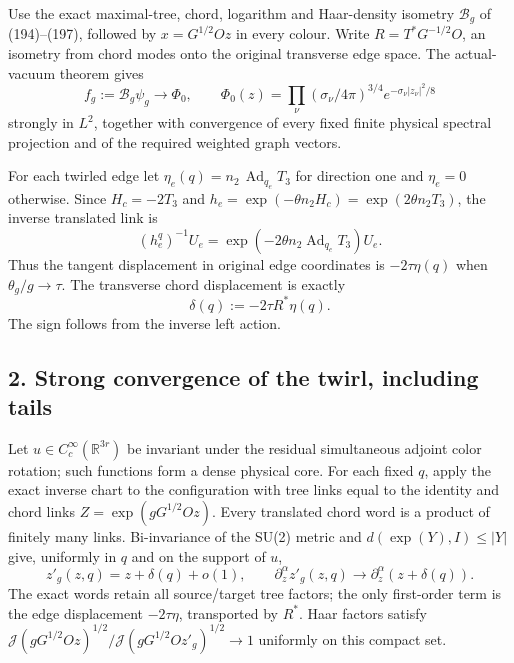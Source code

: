 \documentclass[
  11pt,
]{article}
\begin{document}
Use the exact maximal-tree, chord, logarithm and Haar-density isometry
\(\mathcal B_g\) of (194)--(197), followed by \(x=G^{1/2}Oz\) in every
colour. Write \(R=T^*G^{-1/2}O\), an isometry from chord modes onto the
original transverse edge space. The actual-vacuum theorem gives \[
 f_g:=\mathcal B_g\psi_g\to\Phi_0,\qquad
 \Phi_0(z)=\prod_\nu(\sigma_\nu/4\pi)^{3/4}e^{-\sigma_\nu|z_\nu|^2/8}
\] strongly in \(L^2\), together with convergence of every fixed finite
physical spectral projection and of the required weighted graph vectors.

For each twirled edge let \(\eta_e(q)=n_2\,\operatorname{Ad}_{q_e}T_3\)
for direction one and \(\eta_e=0\) otherwise. Since \(H_c=-2T_3\) and
\(h_e=\exp(-\theta n_2H_c)=\exp(2\theta n_2T_3)\), the inverse
translated link is \[
 (h_e^q)^{-1}U_e=\exp(-2\theta n_2\operatorname{Ad}_{q_e}T_3)U_e.
\] Thus the tangent displacement in original edge coordinates is
\(-2\tau\eta(q)\) when \(\theta_g/g\to\tau\). The transverse chord
displacement is exactly \[
 \delta(q):=-2\tau R^*\eta(q). \tag{S1}
\] The sign follows from the inverse left action.

\subsection{2. Strong convergence of the twirl, including
tails}\label{strong-convergence-of-the-twirl-including-tails}

Let \(u\in C_c^\infty(\mathbb R^{3r})\) be invariant under the residual
simultaneous adjoint color rotation; such functions form a dense
physical core. For each fixed \(q\), apply the exact inverse chart to
the configuration with tree links equal to the identity and chord links
\(Z=\exp(gG^{1/2}Oz)\). Every translated chord word is a product of
finitely many links. Bi-invariance of the SU(2) metric and
\(d(\exp(Y),I)\le |Y|\) give, uniformly in \(q\) and on the support of
\(u\), \[
 z'_g(z,q)=z+\delta(q)+o(1),\qquad
 \partial_z^\alpha z'_g(z,q)\to\partial_z^\alpha(z+\delta(q)). \tag{S2}
\] The exact words retain all source/target tree factors; the only
first-order term is the edge displacement \(-2\tau\eta\), transported by
\(R^*\). Haar factors satisfy
\(\mathcal J(gG^{1/2}Oz)^{1/2}/\mathcal J(gG^{1/2}Oz'_g)^{1/2}\to1\)
uniformly on this compact set.
\end{document}
